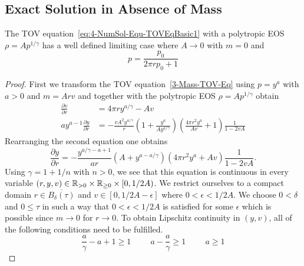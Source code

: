 \subsection{Exact \texorpdfstring{}{TOV} Solution in Absence of Mass}
\label{subsec:99-App-TOV-No-Mass}
\begin{theorem}
	The TOV equation~\ref{eq:4-NumSol-Equ-TOVEqBasic1} with a polytropic EOS $\rho=Ap^{1/\gamma}$ has a well defined limiting case where $A\rightarrow0$ with $m=0$ and
	\begin{equation}
		p = \frac{p_0}{2\pi rp_0+1}
		\label{eq:99-App-TOV-No-Mass-Sol}
	\end{equation}
\end{theorem}
\begin{proof}
	First we transform the TOV equation~\ref{3-Mass-TOV-Eq} using $p=y^a$ with $a>0$ and $m=Arv$ and together with the polytropic EOS $\rho=Ap^{1/\gamma}$ obtain
	\begin{align}
		\frac{\partial v}{\partial r} &= 4\pi ry^{a/\gamma}-Av\\
		ay^{a-1}\frac{\partial y}{\partial r} &= -\frac{vA^2 y^{a/\gamma}}{r}\left(1+\frac{y^a}{Ay^{a/\gamma}}\right)\left(\frac{4\pi r^2 y^a}{Av} +1\right)\frac{1}{1-2vA}
		\label{tmp-label-2}
	\end{align}
	Rearranging the second equation one obtains
	\begin{equation}
		\frac{\partial y}{\partial r} = -\frac{y^{a/\gamma-a+1}}{ar}\left(A+y^{a-a/\gamma}\right)\left(4\pi r^2 y^a +Av\right)\frac{1}{1-2vA}.
		\label{eq:99-App-TOV-No-Mass-Transformed-TOV-Eq}
	\end{equation}
	Using $\gamma=1+1/n$ with $n>0$, we see that this equation is continuous in every variable $(r,y,v)\in\mathbb{R}_{>0}\times\mathbb{R}_{\geq0}\times[0,1/2A)$.
	We restrict ourselves to a compact domain $r\in \overline{B_{\delta}(\tau)}$ and $v\in[0,1/2A-\epsilon]$ where $0<\epsilon<1/2A$.
	We choose $0<\delta$ and $0\leq\tau$ in such a way that $0<\epsilon<1/2A$ is satisfied for some $\epsilon$ which is possible since $m\rightarrow0$ for $r\rightarrow0$.
	To obtain Lipschitz continuity in $(y,v)$, all of the following conditions need to be fulfilled.
	\begin{equation}
		\frac{a}{\gamma}-a+1 \geq 1 \hspace{1cm} a-\frac{a}{\gamma} \geq 1 \hspace{1cm} a \geq 1
		\label{eq:99-App-TOV-No-Mass-Parameter-Condition}

\end{equation}
\end{proof}
